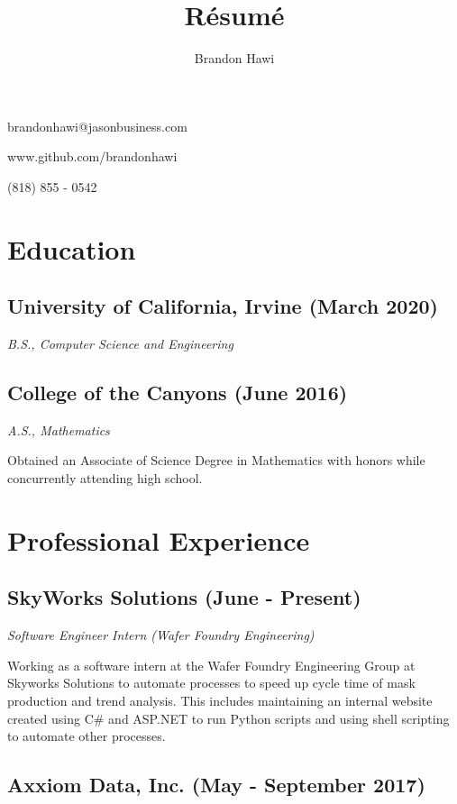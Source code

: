 \documentclass{article}
\makeatletter
\renewcommand{\maketitle}
{
\begin{flushleft}
\huge
\textbf{\theauthor}
\small

brandonhawi@jasonbusiness.com

www.github.com/brandonhawi

(818) 855 - 0542
\end{flushleft}
}
\makeatother
\begin{document}
\title{R\'esum\'e}
\author{Brandon Hawi}

\maketitle
\vspace{-0.1in}
\section{Education}

\subsection{University of California, Irvine (March 2020)}
\noindent\textit{B.S., Computer Science and Engineering}

\subsection{College of the Canyons (June 2016)}
\noindent\textit{A.S., Mathematics}

Obtained an Associate of Science Degree in Mathematics with honors while concurrently attending
high school.

\section{Professional Experience}

%
%
%

\subsection{SkyWorks Solutions (June - Present)}

\noindent\textit{Software Engineer Intern (Wafer Foundry Engineering)}

Working as a software intern at the Wafer Foundry Engineering Group at Skyworks Solutions to 
automate processes to speed up cycle time of mask production and trend analysis. This includes maintaining an internal website 
created using C\# and ASP.NET to run Python scripts and using shell scripting to automate other processes.

\subsection{Axxiom Data, Inc. (May - September 2017)}
\end{document}
